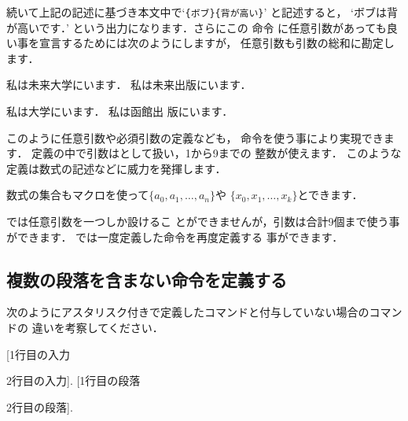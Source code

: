 続いて上記の記述に基づき本文中で`\verb|{ボブ}{背が高い}|'
と記述すると，
`ボブは背が高いです．'
という出力になります．さらにこの 命令
に任意引数があっても良い事を宣言するためには次のようにしますが，
任意引数も引数の総和に勘定します．
\begin{inout}
\newcommand{\example}[2][未来]{%
  私は#1#2にいます．}
\example{大学}   \example{出版}\par
\example[]{大学} \example[函館]{出
版}
\end{inout}
このように任意引数や必須引数の定義なども，
命令を使う事により実現できます．
定義の中で引数は\qu{\texttt\#}として扱い，1から9までの
整数が使えます．
このような定義は数式の記述などに威力を発揮します．
\begin{inout}
\newcommand{\seq}[2][n]{%
 \{#2_{0},#2_{1},\ldots,#2_{#1}\}}
数式の集合もマクロを使って$\seq{a}$や
$\seq[k]{x}$とできます．
\end{inout}

では任意引数を一つしか設けるこ
とができませんが，引数は合計9個まで使う事ができます．
では一度定義した命令を再度定義する
事ができます．

\subsection{複数の段落を含まない命令を定義する}

次のようにアスタリスク付きで定義したコマンドと付与していない場合のコマンドの
違いを考察してください．

\begin{intext}
\newcommand\testargs[1]{[#1]}
\newcommand*\testArgs[1]{[#1]}
\testArgs{1行目の入力\par 2行目の入力}.
\testargs{1行目の段落\par 2行目の段落}.
\end{intext} 

